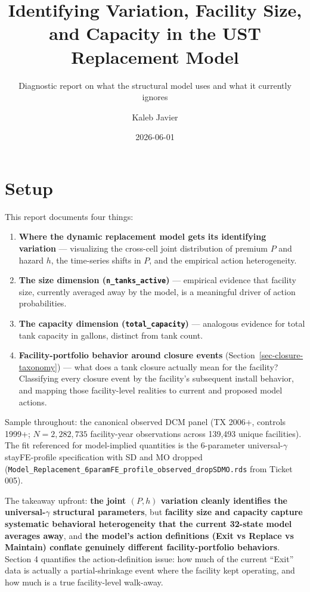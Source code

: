 \documentclass[
  11pt,
]{article}
\title{Identifying Variation, Facility Size, and Capacity in the UST
Replacement Model}
\subtitle{Diagnostic report on what the structural model uses and what
it currently ignores}
\author{Kaleb Javier}
\date{2026-06-01}
\providecommand{\tightlist}{%
  \setlength{\itemsep}{0pt}\setlength{\parskip}{0pt}}\usepackage{longtable,booktabs,array}
\renewcommand*\contentsname{Table of contents}
\newcommand\contentsname{Table of contents}
\begin{document}
\maketitle

\renewcommand*\contentsname{Table of contents}
{
\hypersetup{linkcolor=}
\setcounter{tocdepth}{3}
\tableofcontents
}
\section{Setup}\label{setup}

This report documents four things:

\begin{enumerate}
\def\labelenumi{\arabic{enumi}.}
\tightlist
\item
  \textbf{Where the dynamic replacement model gets its identifying
  variation} --- visualizing the cross-cell joint distribution of
  premium \(P\) and hazard \(h\), the time-series shifts in \(P\), and
  the empirical action heterogeneity.
\item
  \textbf{The size dimension (\texttt{n\_tanks\_active})} --- empirical
  evidence that facility size, currently averaged away by the model, is
  a meaningful driver of action probabilities.
\item
  \textbf{The capacity dimension (\texttt{total\_capacity})} ---
  analogous evidence for total tank capacity in gallons, distinct from
  tank count.
\item
  \textbf{Facility-portfolio behavior around closure events}
  (Section~\ref{sec-closure-taxonomy}) --- what does a tank closure
  actually mean for the facility? Classifying every closure event by the
  facility's subsequent install behavior, and mapping those
  facility-level realities to current and proposed model actions.
\end{enumerate}

Sample throughout: the canonical observed DCM panel (TX 2006+, controls
1999+; \(N = 2{,}282{,}735\) facility-year observations across 139,493
unique facilities). The fit referenced for model-implied quantities is
the 6-parameter universal-\(\gamma\) stayFE-profile specification with
SD and MO dropped
(\texttt{Model\_Replacement\_6paramFE\_profile\_observed\_dropSDMO.rds}
from Ticket 005).

The takeaway upfront: \textbf{the joint \((P, h)\) variation cleanly
identifies the universal-\(\gamma\) structural parameters}, but
\textbf{facility size and capacity capture systematic behavioral
heterogeneity that the current 32-state model averages away}, and
\textbf{the model's action definitions (Exit vs Replace vs Maintain)
conflate genuinely different facility-portfolio behaviors}. Section 4
quantifies the action-definition issue: how much of the current ``Exit''
data is actually a partial-shrinkage event where the facility kept
operating, and how much is a true facility-level walk-away.
\end{document}
